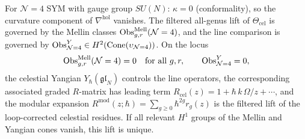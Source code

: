 \begin{proposition}[Celestial holographic datum for $\mathcal N=4$ SYM]
\label{prop:celestial-hmkd-n4-obstruction-locus}
For $\mathcal N=4$ SYM with gauge group $SU(N)$:
$\kappa=0$ (conformality), so the curvature component of
$\nabla^{\mathrm{hol}}$ vanishes. The filtered all-genus lift of
$\Theta_{\mathrm{cel}}$ is governed by the Mellin classes
$\operatorname{Obs}_{g,r}^{\mathrm{Mell}}(\mathcal N=4)$, and the line comparison is governed by
$\operatorname{Obs}_{\mathcal N=4}^{Y}\in H^2(\operatorname{Cone}(\upsilon_{\mathcal N=4}))$.
On the locus
\[
\operatorname{Obs}_{g,r}^{\mathrm{Mell}}(\mathcal N=4)=0\quad\text{for all }g,r,
\qquad
\operatorname{Obs}_{\mathcal N=4}^{Y}=0,
\]
the celestial Yangian $Y_\hbar(\mathfrak{gl}_N)$ controls the line operators, the
corresponding associated graded $R$-matrix has leading term
$R_{\mathrm{cel}}(z)=1+\hbar\,k\,\Omega/z+\cdots$, and the modular expansion
$R^{\mathrm{mod}}(z;\hbar)=\sum_{g\ge 0}\hbar^{2g}r_g(z)$ is the filtered lift of the
loop-corrected celestial residues. If all relevant $H^1$ groups of the Mellin and Yangian
cones vanish, this lift is unique.
\end{proposition}
